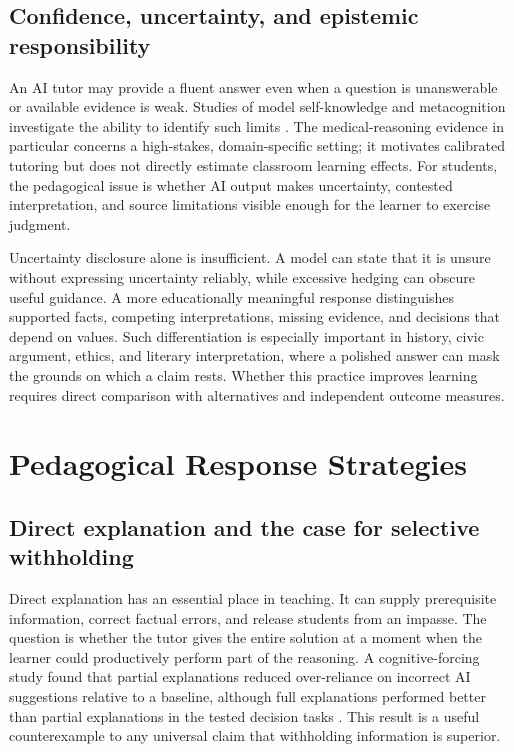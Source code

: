 \documentclass[11pt,a4paper]{article}
\begin{document}
\subsection{Confidence, uncertainty, and epistemic responsibility}
An AI tutor may provide a fluent answer even when a question is unanswerable or available evidence is weak. Studies of model self-knowledge and metacognition investigate the ability to identify such limits \cite{P18,P22,P34}. The medical-reasoning evidence in particular concerns a high-stakes, domain-specific setting; it motivates calibrated tutoring but does not directly estimate classroom learning effects. For students, the pedagogical issue is whether AI output makes uncertainty, contested interpretation, and source limitations visible enough for the learner to exercise judgment.

Uncertainty disclosure alone is insufficient. A model can state that it is unsure without expressing uncertainty reliably, while excessive hedging can obscure useful guidance. A more educationally meaningful response distinguishes supported facts, competing interpretations, missing evidence, and decisions that depend on values. Such differentiation is especially important in history, civic argument, ethics, and literary interpretation, where a polished answer can mask the grounds on which a claim rests. Whether this practice improves learning requires direct comparison with alternatives and independent outcome measures.

\section{Pedagogical Response Strategies}
\subsection{Direct explanation and the case for selective withholding}
Direct explanation has an essential place in teaching. It can supply prerequisite information, correct factual errors, and release students from an impasse. The question is whether the tutor gives the entire solution at a moment when the learner could productively perform part of the reasoning. A cognitive-forcing study found that partial explanations reduced over-reliance on incorrect AI suggestions relative to a baseline, although full explanations performed better than partial explanations in the tested decision tasks \cite{P13}. This result is a useful counterexample to any universal claim that withholding information is superior.
\end{document}
